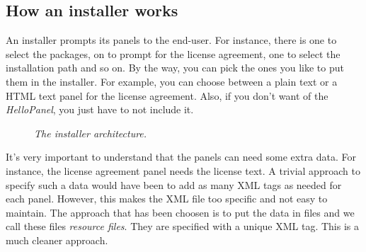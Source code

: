 \subsection{How an installer works}

An installer prompts its panels to the end-user. For instance, there is one to
select the packages, on to prompt for the license agreement, one to select the
installation path and so on. By the way, you can pick the ones you like to put
them in the installer. For example, you can choose between a plain text or a
HTML text panel for the license agreement. Also, if you don't want of the
\textit{HelloPanel}, you just have to not include it.\\ 

\begin{figure}[h]
\caption{\label{archinstaller}
         \textit{The installer architecture.}}
\begin{center}
\end{center}
\end{figure}

It's very important to understand that the panels can need some extra data. For
instance, the license agreement panel needs the license text. A trivial approach
to specify such a data would have been to add as many XML tags as needed for
each panel. However, this makes the XML file too specific and not easy to
maintain. The approach that has been choosen is to put the data in files and we
call these files \textit{resource files}. They are specified with a unique XML
tag. This is a much cleaner approach.\\

